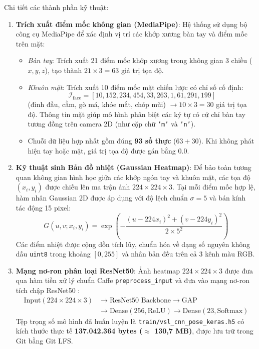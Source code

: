 Chi tiết các thành phần kỹ thuật:
\begin{enumerate}
    \item \textbf{Trích xuất điểm mốc không gian (MediaPipe)}:
    Hệ thống sử dụng bộ công cụ MediaPipe \cite{lugaresi2019mediapipe} để xác định vị trí các khớp xương bàn tay và điểm mốc trên mặt:
    \begin{itemize}
        \item \textit{Bàn tay}: Trích xuất 21 điểm mốc khớp xương trong không gian 3 chiều ($x, y, z$), tạo thành $21 \times 3 = 63$ giá trị tọa độ.
        \item \textit{Khuôn mặt}: Trích xuất 10 điểm mốc mặt chiến lược có chỉ số cố định:
        \begin{equation}
        \mathcal{I}_{\text{face}} = [10, 152, 234, 454, 33, 263, 1, 61, 291, 199]
        \end{equation}
        (đỉnh đầu, cằm, gò má, khóe mắt, chóp mũi) $\to 10 \times 3 = 30$ giá trị tọa độ. Thông tin mặt giúp mô hình phân biệt các ký tự có cử chỉ bàn tay tương đồng trên camera 2D (như cặp chữ \texttt{'m'} và \texttt{'n'}).
        \item Chuỗi dữ liệu hợp nhất gồm đúng \textbf{93 số thực} ($63 + 30$). Khi không phát hiện tay hoặc mặt, giá trị tọa độ được gán bằng $0.0$.
    \end{itemize}

    \item \textbf{Kỹ thuật sinh Bản đồ nhiệt (Gaussian Heatmap)}:
    Để bảo toàn tương quan không gian hình học giữa các khớp ngón tay và khuôn mặt, các tọa độ $(x_i, y_i)$ được chiếu lên ma trận ảnh $224 \times 224 \times 3$. Tại mỗi điểm mốc hợp lệ, hàm nhân Gaussian 2D được áp dụng với độ lệch chuẩn $\sigma = 5$ và bán kính tác động 15 pixel:
    \begin{equation}
    G(u, v; x_i, y_i) = \exp\left( -\frac{(u - 224 x_i)^2 + (v - 224 y_i)^2}{2 \times 5^2} \right)
    \end{equation}
    Các điểm nhiệt được cộng dồn tích lũy, chuẩn hóa về dạng số nguyên không dấu \texttt{uint8} trong khoảng $[0, 255]$ và nhân bản đều trên cả 3 kênh màu RGB.

    \item \textbf{Mạng nơ-ron phân loại ResNet50}:
    Ảnh heatmap $224 \times 224 \times 3$ được đưa qua hàm tiền xử lý chuẩn Caffe \texttt{preprocess\_input} và đưa vào mạng nơ-ron tích chập ResNet50 \cite{he2016deep}:
    \begin{equation}
    \label{eq:resnet_architecture}
    \begin{aligned}
    \text{Input}(224 \times 224 \times 3) & \to \text{ResNet50 Backbone} \to \text{GAP} \\
    & \to \text{Dense}(256, \text{ReLU}) \to \text{Dense}(23, \text{Softmax})
    \end{aligned}
    \end{equation}
    Tệp trọng số mô hình đã huấn luyện là \texttt{train/vsl\_cnn\_pose\_keras.h5} có kích thước thực tế \textbf{137.042.364 bytes ($\approx$ 130,7 MB)}, được lưu trữ trong Git bằng Git LFS.
\end{enumerate}

